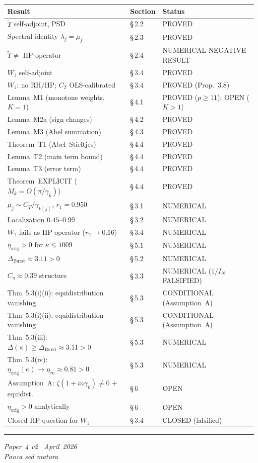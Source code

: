 \documentclass[11pt]{article}
\newcommand{\etaorig}{\eta_{\mathrm{orig}}}
\newcommand{\Tt}{\widetilde{T}}
\newcommand{\Ceta}{C_{\eta}}
\newcommand{\CT}{C_{T}}
\newcommand{\Wone}{W_1}
\newcommand{\Dburstvar}{\Delta_{\mathrm{Burst}}}
\begin{document}
\begin{center}
\renewcommand{\arraystretch}{1.2}
\begin{tabular}{lll}
\toprule
Result & Section & Status \\
\midrule
$\Tt$ self-adjoint, PSD & \S\,2.2 & PROVED \\
Spectral identity $\lambda_j=\mu_j$ & \S\,2.3 & PROVED \\
$\Tt\neq$ HP-operator & \S\,2.4 & NUMERICAL NEGATIVE RESULT \\
$\Wone$ self-adjoint & \S\,3.4 & PROVED \\
$\Wone$: no RH/HP; $\CT$ OLS-calibrated & \S\,3.4 & PROVED (Prop.~3.8) \\
Lemma~M1 (monotone weights, $K=1$) & \S\,4.1 & PROVED ($p\geq 11$); OPEN ($K>1$) \\
Lemma~M2a (sign changes) & \S\,4.2 & PROVED \\
Lemma~M3 (Abel summation) & \S\,4.3 & PROVED \\
Theorem~T1 (Abel--Stieltjes) & \S\,4.4 & PROVED \\
Lemma~T2 (main term bound) & \S\,4.4 & PROVED \\
Lemma~T3 (error term) & \S\,4.4 & PROVED \\
Theorem~EXPLICIT ($M_k=O(\pi/\gamma_k)$) & \S\,4.4 & PROVED \\
$\mu_j\sim\CT/\gamma_{k(j)}$, $r_1=0.950$ & \S\,3.1 & NUMERICAL \\
Localization $0.45$--$0.99$ & \S\,3.2 & NUMERICAL \\
$\Wone$ fails as HP-operator ($r_2\to 0.16$) & \S\,3.4 & NUMERICAL \\
$\etaorig > 0$ for $\kappa\leq 1009$ & \S\,5.1 & NUMERICAL \\
$\Dburstvar\approx 3.11 > 0$ & \S\,5.2 & NUMERICAL \\
$\Ceta\approx 0.39$ structure & \S\,3.3 & NUMERICAL ($1/I_N$ FALSIFIED) \\
Thm~5.3(i)(ii): equidistribution vanishing & \S\,5.3 & CONDITIONAL (Assumption~A) \\
Thm~5.3(i)(ii): equidistribution vanishing & \S\,5.3 & CONDITIONAL (Assumption~A) \\
Thm~5.3(iii): $\Delta(\kappa)\geq\Dburstvar\approx 3.11 > 0$
  & \S\,5.3 & NUMERICAL \\
Thm~5.3(iv): $\etaorig(\kappa)\to\eta_\infty\approx 0.81 > 0$
  & \S\,5.3 & NUMERICAL \\
Assumption~A: $\zeta(1+in\gamma_k)\neq 0$ + equidist. & \S\,6 & OPEN \\
$\etaorig > 0$ analytically & \S\,6 & OPEN \\
Closed HP-question for $\Wone$ & \S\,3.4 & CLOSED (falsified) \\
\bottomrule
\end{tabular}
\end{center}

\bigskip
\hrule
\smallskip
\noindent\small
\emph{Paper~4 v2 \textperiodcentered\ April~2026}\\
\emph{Pauca sed matura}
\end{document}
